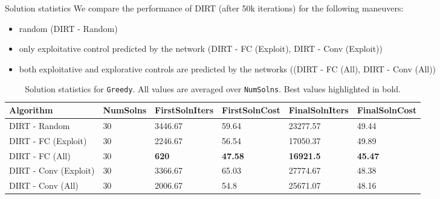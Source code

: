 \begin{columns}[t]
	\begin{column}{0.68\textwidth}
	\vspace{-0.1in}
		\begin{block}{\large Solution statistics}
		We compare the performance of DIRT (after 50k iterations) for the following maneuvers: 
		\begin{itemize}
			\item random (DIRT - Random) 
			\item only exploitative control predicted by the network (DIRT - FC (Exploit), DIRT - Conv (Exploit))
			\item both exploitative and explorative controls are predicted by the networks ((DIRT - FC (All), DIRT - Conv (All))
		\end{itemize} 
			\vspace{0.1in}
			\begin{table}[]
				\centering
				\begin{tabular}{|l|l|l|l|l|l|}
				\hline
				\textbf{Algorithm}    & \textbf{NumSolns} & \textbf{FirstSolnIters} & \textbf{FirstSolnCost} & \textbf{FinalSolnIters} & \textbf{FinalSolnCost} \\ [0.5ex]  \hline
				DIRT - Random         & 30                    & 3446.67                 & 59.64                     & 23277.57                & 49.44                     \\ \hline
				DIRT - FC (Exploit)   & 30                    & 2246.67                 & 56.54                     & 17050.37                & 49.89                     \\ \hline
				DIRT - FC (All)       & 30                    & \textbf{620}                     & \textbf{47.58}                     & \textbf{16921.5}                 & \textbf{45.47}                     \\ \hline
				DIRT - Conv (Exploit) & 30                    & 3366.67                 & 65.03                     & 27774.67                & 48.38                     \\ \hline
				DIRT - Conv (All)     & 30                    & 2006.67                 & 54.8                      & 25671.07                & 48.16                     \\   \hline
				\end{tabular}
				\vspace{.1in}
				\caption{Solution statistics for \texttt{Greedy}. All values are averaged over \texttt{NumSolns}. Best values highlighted in bold.
}
\end{table}
\end{block}
\end{column}
\end{columns}

